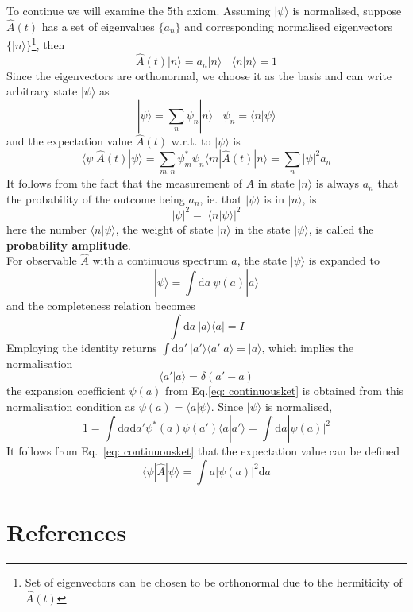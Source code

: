 \documentclass{article}
\begin{document}
\hrulefill
To continue we will examine the 5th axiom. Assuming $|\psi\rangle$ is normalised, suppose $\hat{A}(t)$ has a set of eigenvalues $\lbrace a_n\rbrace$ and corresponding normalised eigenvectors $\lbrace |n\rangle\rbrace$\footnote{Set of eigenvectors can be chosen to be orthonormal due to the hermiticity of $\hat{A}(t)$}, then
\begin{equation}
\hat{A}(t)|n\rangle = a_n|n\rangle ~~~~ \langle n|n\rangle=1
\end{equation}
Since the eigenvectors are orthonormal, we choose it as the basis and can write arbitrary state $|\psi\rangle$ as
\begin{equation}
|\psi\rangle =\sum_n\psi_n|n\rangle~~~~\psi_n=\langle n|\psi\rangle
\end{equation}
and the expectation value $\hat{A}(t)$ w.r.t. to $|\psi\rangle $ is
\begin{equation}
\langle \psi|\hat{A}(t)|\psi\rangle=\sum_{m,n}\psi^*_m\psi_n\langle m|\hat{A}(t)|n\rangle=\sum_n |\psi |^2a_n
\end{equation}
It follows from the fact that the measurement of $A$ in state $|n\rangle$ is always $a_n$ that the probability of the outcome being $a_n$, ie. that $|\psi \rangle$ is in $|n\rangle$, is
\begin{equation}
|\psi|^2=|\langle n|\psi\rangle|^2
\end{equation}
here the number $\langle n|\psi\rangle$, the weight of state $|n\rangle$ in the state $|\psi\rangle$, is called the \textbf{probability amplitude}.\\
\indent For observable $\hat{A}$ with a continuous spectrum $a$, the state $|\psi\rangle$ is expanded to
\begin{equation}
|\psi\rangle=\int \mathrm{d}a~\psi(a)|a\rangle
\label{eq: continuousket}
\end{equation}
and the completeness relation becomes
\begin{equation}
\int \mathrm{d}a~|a\rangle\langle a |=I
\end{equation}
Employing the identity returns $\int \mathrm{d}a'~|a'\rangle\langle a' |a\rangle=|a\rangle$, which implies the normalisation
\begin{equation}
\langle a'| a \rangle=\delta(a'-a)
\end{equation}
the expansion coefficient $\psi(a)$ from Eq.\ref{eq: continuousket} is obtained from this normalisation condition as $\psi(a)=\langle a | \psi \rangle$. Since $|\psi\rangle $ is normalised,
\begin{equation}
1=\int \mathrm{d}a\mathrm{d}a'\psi^*(a)\psi(a')\langle a | a'\rangle=\int \mathrm{d}a|\psi(a)|^2
\end{equation}
It follows from Eq.~\ref{eq: continuousket} that the expectation value can be defined
\begin{equation}
\langle\psi|\hat{A}|\psi\rangle = \int a |\psi(a)|^2\mathrm{d}a
\end{equation}
\section{References}
\enumerate
\end{document}
